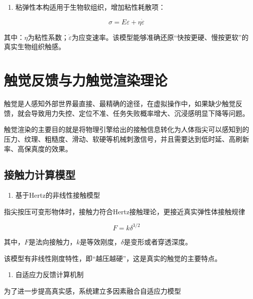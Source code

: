 \begin{enumerate}
\def\labelenumi{\arabic{enumi}.}
\setcounter{enumi}{1}
\item
  粘弹性本构适用于生物软组织，增加粘性耗散项：
\end{enumerate}

\begin{equation}
\sigma = E\varepsilon + \eta\dot{\varepsilon}
\end{equation}

其中：$\eta$为粘性系数；$\dot{\varepsilon}$为应变速率。该模型能够准确还原``快按更硬、慢按更软''的真实生物组织触感。

\section{触觉反馈与力触觉渲染理论}

触觉是人感知外部世界最直接、最精确的途径，在虚拟操作中，如果缺少触觉反馈，就会导致用力失控、定位不准、任务失败概率增大、沉浸感明显下降等问题。

触觉渲染的主要目的就是将物理引擎给出的接触信息转化为人体指尖可以感知到的压力、纹理、粗糙度、滑动、软硬等机械刺激信号，并且需要达到低时延、高刷新率、高保真度的效果。

\subsection{接触力计算模型}

\begin{enumerate}
\def\labelenumi{\arabic{enumi}.}
\item
  基于Hertz的非线性接触模型
\end{enumerate}

指尖按压可变形物体时，接触力符合Hertz接触理论，更接近真实弹性体接触规律

\begin{equation}
F = k\delta^{3/2}
\end{equation}

其中，$F$是法向接触力，$k$是等效刚度，$\delta$是变形或者穿透深度。

该模型有非线性刚度特性，即``越压越硬''，这是真实的触觉的主要特点。

\begin{enumerate}
\def\labelenumi{\arabic{enumi}.}
\setcounter{enumi}{1}
\item
  自适应力反馈计算机制
\end{enumerate}

为了进一步提高真实感，系统建立多因素融合自适应力模型

